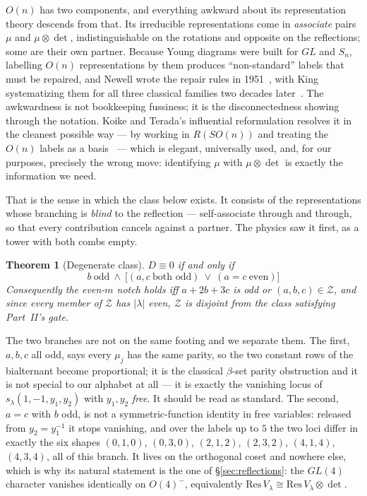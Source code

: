 \documentclass[11pt,a4paper]{article}
\newtheorem{theorem}{Theorem}
\newcommand{\lam}{|\lambda|}
\begin{document}
$O(n)$ has two components, and everything awkward about its representation theory descends
from that. Its irreducible representations come in \emph{associate} pairs $\mu$ and
$\mu\otimes\det$, indistinguishable on the rotations and opposite on the reflections; some
are their own partner. Because Young diagrams were built for $GL$ and $S_n$, labelling
$O(n)$ representations by them produces ``non-standard'' labels that must be repaired, and
Newell wrote the repair rules in 1951~\cite{Newell}, with King systematizing them for all
three classical families two decades later~\cite{King71}. The awkwardness is not
bookkeeping fussiness; it is the disconnectedness showing through the notation. Koike and
Terada's influential reformulation resolves it in the cleanest possible way --- by working
in $R(SO(n))$ and treating the $O(n)$ labels as a basis~\cite{KoikeTerada} --- which is
elegant, universally used, and, for our purposes, precisely the wrong move: identifying
$\mu$ with $\mu\otimes\det$ is exactly the information we need.

That is the sense in which the class below exists. It consists of the representations whose
branching is \emph{blind} to the reflection --- self-associate through and through, so that
every contribution cancels against a partner. The physics saw it first, as a tower with
both combs empty.

\begin{theorem}[Degenerate class]\label{thm:Z}
$D\equiv0$ if and only if
\[
\boxed{\;b\ \text{odd}\ \wedge\ \big[(a,c\ \text{both odd})\ \vee\ (a=c\ \text{even})\big]\;}
\]
Consequently the even-$m$ notch holds iff $a+2b+3c$ is odd or $(a,b,c)\in\mathcal Z$, and
since every member of $\mathcal Z$ has $\lam$ even, $\mathcal Z$ is disjoint from the class
satisfying Part~II's gate.
\end{theorem}

The two branches are not on the same footing and we separate them. The first, $a,b,c$ all odd,
says every $\mu_j$ has the same parity, so the two constant rows of the bialternant become
proportional; it is the classical $\beta$-set parity obstruction and it is not special to our
alphabet at all --- it is exactly the vanishing locus of $s_\lambda(1,-1,y_1,y_2)$ with $y_1,y_2$
\emph{free}. It should be read as standard. The second, $a=c$ with $b$ odd, is not a
symmetric-function identity in free variables: released from $y_2=y_1^{-1}$ it stops vanishing,
and over the labels up to $5$ the two loci differ in exactly the six shapes $(0,1,0)$, $(0,3,0)$,
$(2,1,2)$, $(2,3,2)$, $(4,1,4)$, $(4,3,4)$, all of this branch. It lives on the orthogonal coset
and nowhere else, which is why its natural statement is the one of \S\ref{sec:reflections}:
the $GL(4)$ character vanishes identically on $O(4)^-$, equivalently
$\mathrm{Res}\,V_\lambda\cong\mathrm{Res}\,V_\lambda\otimes\det$.
\end{document}
